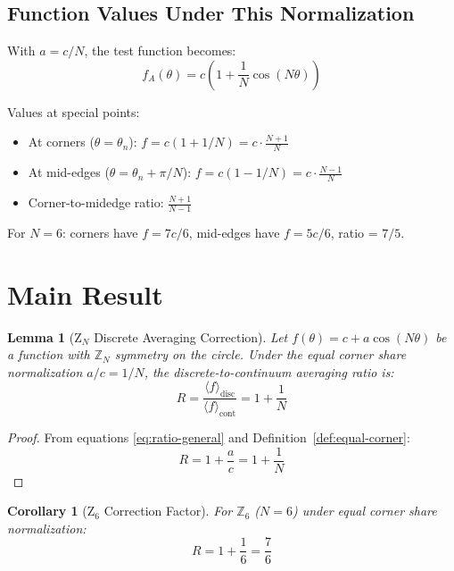 \documentclass[11pt]{article}
\newtheorem{lemma}{Lemma}
\newtheorem{corollary}{Corollary}
\begin{document}
\subsection{Function Values Under This Normalization}

With $a = c/N$, the test function becomes:
\begin{equation}
f_A(\theta) = c\left(1 + \frac{1}{N}\cos(N\theta)\right)
\end{equation}

Values at special points:
\begin{itemize}
\item At corners ($\theta = \theta_n$): $f = c(1 + 1/N) = c \cdot \frac{N+1}{N}$
\item At mid-edges ($\theta = \theta_n + \pi/N$): $f = c(1 - 1/N) = c \cdot \frac{N-1}{N}$
\item Corner-to-midedge ratio: $\frac{N+1}{N-1}$
\end{itemize}

For $N = 6$: corners have $f = 7c/6$, mid-edges have $f = 5c/6$, ratio = $7/5$.

\section{Main Result}

\begin{lemma}[Z$_N$ Discrete Averaging Correction]
\label{lem:zn-correction}
Let $f(\theta) = c + a\cos(N\theta)$ be a function with $\mathbb{Z}_N$ symmetry on the circle.
Under the equal corner share normalization $a/c = 1/N$, the discrete-to-continuum averaging ratio is:
\begin{equation}
\boxed{R = \frac{\langle f \rangle_{\text{disc}}}{\langle f \rangle_{\text{cont}}} = 1 + \frac{1}{N}}
\end{equation}
\end{lemma}

\begin{proof}
From equations \eqref{eq:ratio-general} and Definition~\ref{def:equal-corner}:
\[
R = 1 + \frac{a}{c} = 1 + \frac{1}{N}
\]
\end{proof}

\begin{corollary}[Z$_6$ Correction Factor]
\label{cor:z6-correction}
For $\mathbb{Z}_6$ ($N = 6$) under equal corner share normalization:
\begin{equation}
\boxed{R = 1 + \frac{1}{6} = \frac{7}{6}}
\end{equation}
\end{corollary}
\end{document}
